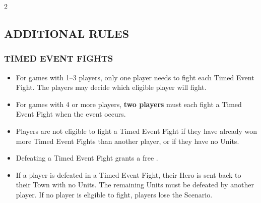 \begin{multicols}{2}
\subsection*{\MakeUppercase{Additional Rules}}
\subsubsection*{\MakeUppercase{Timed Event Fights}}
\begin{itemize}
  \item For games with 1--3 players, only one player needs to fight each Timed Event Fight. The players may decide which eligible player will fight.
  \item For games with 4 or more players, \textbf{two players} must each fight a Timed Event Fight when the event occurs.
  \item Players are not eligible to fight a Timed Event Fight if they have already won more Timed Event Fights than another player, or if they have no Units.
  \item Defeating a Timed Event Fight grants a free .
  \item If a player is defeated in a Timed Event Fight, their Hero is sent back to their Town with no Units. The remaining Units must be defeated by another player. If no player is eligible to fight, players lose the Scenario.
\end{itemize}


\end{multicols}
